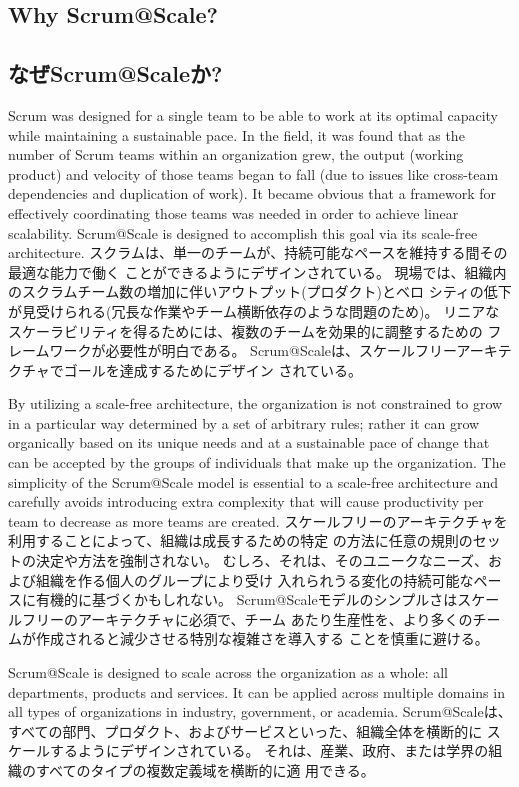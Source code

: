\documentclass[12pt,a4paper,parskip=full]{scrartcl}
\begin{document}
\subsection{Why Scrum@Scale?}
\fi
\subsection{なぜScrum@Scaleか?}
Scrum was designed for a single team to be able to work at its optimal
capacity while maintaining a sustainable pace. In the field, it was found
that as the number of Scrum teams within an organization grew, the 
output (working product) and velocity of those teams began to fall (due to
issues like cross-team dependencies and duplication of work). It became
obvious that a framework for effectively coordinating those teams was
needed in order to achieve linear scalability. Scrum@Scale is designed to
accomplish this goal via its scale-free architecture.
\fi
スクラムは、単一のチームが、持続可能なペースを維持する間その最適な能力で働く
ことができるようにデザインされている。
現場では、組織内のスクラムチーム数の増加に伴いアウトプット(プロダクト)とベロ
シティの低下が見受けられる(冗長な作業やチーム横断依存のような問題のため)。
リニアなスケーラビリティを得るためには、複数のチームを効果的に調整するための
フレームワークが必要性が明白である。
Scrum@Scaleは、スケールフリーアーキテクチャでゴールを達成するためにデザイン
されている。

By utilizing a scale-free architecture, the organization is not constrained
to grow in a particular way determined by a set of arbitrary rules; rather
it can grow organically based on its unique needs and at a sustainable pace
of change that can be accepted by the groups of individuals that make up
the organization. The simplicity of the Scrum@Scale model is essential to a scale-free architecture and carefully avoids introducing extra complexity that will cause productivity per team to decrease as more teams are created.
\fi
スケールフリーのアーキテクチャを利用することによって、組織は成長するための特定
の方法に任意の規則のセットの決定や方法を強制されない。
むしろ、それは、そのユニークなニーズ、および組織を作る個人のグループにより受け
入れられうる変化の持続可能なペースに有機的に基づくかもしれない。
Scrum@Scaleモデルのシンプルさはスケールフリーのアーキテクチャに必須で、チーム
あたり生産性を、より多くのチームが作成されると減少させる特別な複雑さを導入する
ことを慎重に避ける。

Scrum@Scale is designed to scale across the organization as a whole: all
departments, products and services. It can be applied across multiple
domains in all types of organizations in industry, government, or academia.
Scrum@Scaleは、すべての部門、プロダクト、およびサービスといった、組織全体を横断的に
\fi
スケールするようにデザインされている。
それは、産業、政府、または学界の組織のすべてのタイプの複数定義域を横断的に適
用できる。
\end{document}

